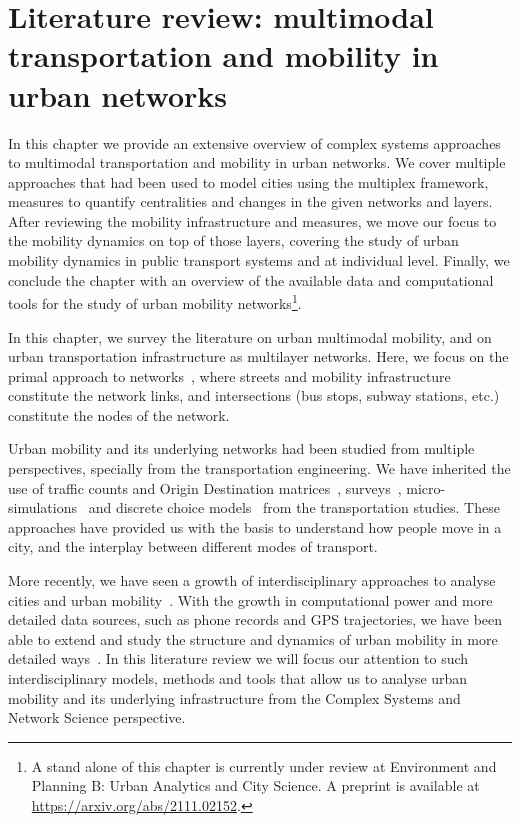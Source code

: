 \chapter[Literature review]{Literature review: multimodal transportation and mobility in urban networks}\label{ch:litReview}

In this chapter we provide an extensive overview of complex systems approaches to multimodal transportation and mobility in urban networks. We cover multiple approaches that had been used to model cities using the multiplex framework, measures to quantify centralities and changes in the given networks and layers. After reviewing the mobility infrastructure and measures, we move our focus to the mobility dynamics on top of those layers, covering the study of urban mobility dynamics in public transport systems and at individual level. Finally, we conclude the chapter with an overview of the available data and computational tools for the study of urban mobility networks\footnote{A stand alone of this chapter is currently under review at Environment and Planning B: Urban Analytics and City Science. A preprint is available at \url{https://arxiv.org/abs/2111.02152}.}.
\pagebreak


In this chapter, we survey the literature on urban multimodal mobility, and on urban transportation infrastructure as multilayer networks. Here, we focus on the primal approach to networks~\cite{porta2006primal}, where streets and mobility infrastructure constitute the network links, and intersections (bus stops, subway stations, etc.) constitute the nodes of the network.

Urban mobility and its underlying networks had been studied from multiple perspectives, specially from the transportation engineering. We have inherited the use of traffic counts and Origin Destination matrices~\cite{cascetta1988framework}, surveys~\cite{richardson1995survey}, micro-simulations~\cite{treiber2000congested} and discrete choice models~\cite{axhausen2016multi} from the transportation studies. These approaches have provided us with the basis to understand how people move in a city, and the interplay between different modes of transport. 

More recently, we have seen a growth of interdisciplinary approaches to analyse cities and urban mobility~\cite{batty2013new}. With the growth in computational power and more detailed data sources, such as phone records and GPS trajectories, we have been able to extend and study the structure and dynamics of urban mobility in more detailed ways~\cite{batty2021framework}. In this literature review we will focus our attention to such interdisciplinary models, methods and tools that allow us to analyse urban mobility and its underlying infrastructure from the Complex Systems and Network Science perspective.

